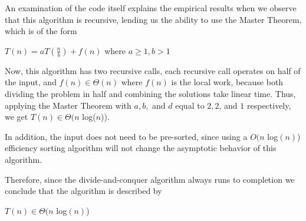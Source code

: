 \documentclass[11pt]{article}
\begin{document}
\begin{center}
    
\end{center}

An examination of the code itself explains the empirical results when we observe that this algorithm is recursive, lending us the ability to use the Master Theorem, which is of the form
\begin{center}
	$T(n)=aT(\frac{n}{b}) + f(n)$ where $a \geq 1, b > 1$
\end{center}

Now, this algorithm has two recursive calls, each recursive call operates on half of the input, and $f(n) \in \Theta( n )$ where $f(n)$ is the local work, because both dividing the problem in half and combining the solutions take linear time. Thus, applying the Master Theorem with $a,b,$ and $d$ equal to $2,2$, and $1$ respectively, we get $T(n) \in \Theta(n$ log($n$)).

In addition, the input does not need to be pre-sorted, since using a $O(n $ log$(n)$) efficiency sorting algorithm will not change the asymptotic behavior of this algorithm. 

Therefore, since the divide-and-conquer algorithm always runs to completion we conclude that the algorithm is described by

\begin{center}
$T(n) \in \Theta( n $ log$(n)$)
\end{center}
\end{document}
